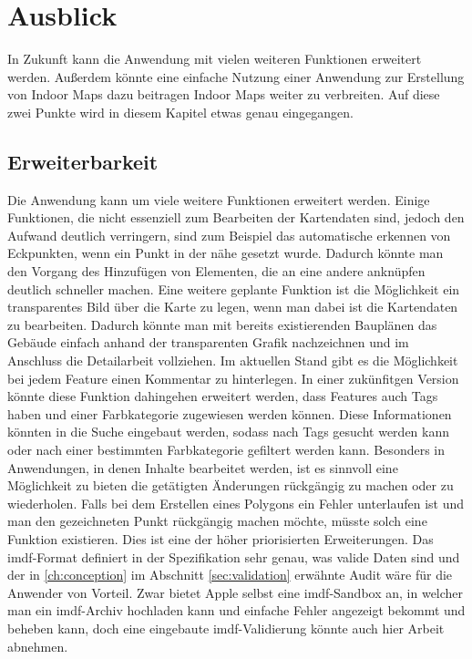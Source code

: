 \section{Ausblick}
In Zukunft kann die Anwendung mit vielen weiteren Funktionen erweitert werden.
Außerdem könnte eine einfache Nutzung einer Anwendung zur Erstellung von Indoor Maps dazu beitragen Indoor Maps weiter zu verbreiten.
Auf diese zwei Punkte wird in diesem Kapitel etwas genau eingegangen.

\subsection{Erweiterbarkeit}
Die Anwendung kann um viele weitere Funktionen erweitert werden.
Einige Funktionen, die nicht essenziell zum Bearbeiten der Kartendaten sind, jedoch den Aufwand deutlich verringern, sind zum Beispiel das automatische erkennen von Eckpunkten, wenn ein Punkt in der nähe gesetzt wurde.
Dadurch könnte man den Vorgang des Hinzufügen von Elementen, die an eine andere anknüpfen deutlich schneller machen.\pbreak
%
Eine weitere geplante Funktion ist die Möglichkeit ein transparentes Bild über die Karte zu legen, wenn man dabei ist die Kartendaten zu bearbeiten.
Dadurch könnte man mit bereits existierenden Bauplänen das Gebäude einfach anhand der transparenten Grafik nachzeichnen und im Anschluss die Detailarbeit vollziehen.\pbreak%
%
Im aktuellen Stand gibt es die Möglichkeit bei jedem Feature einen Kommentar zu hinterlegen.
In einer zukünfitgen Version könnte diese Funktion dahingehen erweitert werden, dass Features auch Tags haben und einer Farbkategorie zugewiesen werden können.
Diese Informationen könnten in die Suche eingebaut werden, sodass nach Tags gesucht werden kann oder nach einer bestimmten Farbkategorie gefiltert werden kann.\pbreak%
%
Besonders in Anwendungen, in denen Inhalte bearbeitet werden, ist es sinnvoll eine Möglichkeit zu bieten die getätigten Änderungen rückgängig zu machen oder zu wiederholen.
Falls bei dem Erstellen eines Polygons ein Fehler unterlaufen ist und man den gezeichneten Punkt rückgängig machen möchte, müsste solch eine Funktion existieren.
Dies ist eine der höher priorisierten Erweiterungen.\pbreak%
%
Das \ac{imdf}-Format definiert in der Spezifikation sehr genau, was valide Daten sind und der in \autoref{ch:conception} im Abschnitt \autoref{sec:validation} erwähnte Audit wäre für die Anwender von Vorteil.
Zwar bietet Apple selbst eine \ac{imdf}-Sandbox an, in welcher man ein \ac{imdf}-Archiv hochladen kann und einfache Fehler angezeigt bekommt und beheben kann, doch eine eingebaute \ac{imdf}-Validierung könnte auch hier Arbeit abnehmen.
